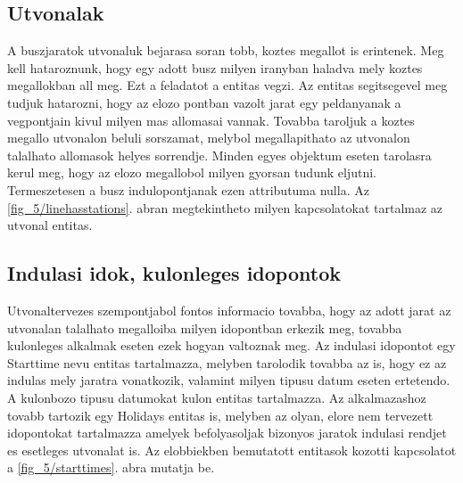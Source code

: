 \subsection*{Utvonalak}
\label{linehasstationsdetails}
A buszjaratok utvonaluk bejarasa soran tobb, koztes megallot is erintenek. 
Meg kell hataroznunk, hogy egy adott busz milyen iranyban haladva mely koztes megallokban all meg. 
Ezt a feladatot a  entitas vegzi. 
Az entitas segitsegevel meg tudjuk hatarozni, hogy az elozo pontban vazolt jarat egy peldanyanak a vegpontjain kivul milyen mas allomasai vannak. 
Tovabba taroljuk a koztes megallo utvonalon beluli sorszamat, melybol megallapithato az utvonalon talalhato allomasok helyes sorrendje. 
Minden egyes objektum eseten tarolasra kerul meg, hogy az elozo megallobol milyen gyorsan tudunk eljutni. 
Termeszetesen a busz indulopontjanak ezen attributuma nulla. 
Az \ref{fig_5/linehasstations}. abran megtekintheto milyen kapcsolatokat tartalmaz az utvonal entitas. 
\subsection*{Indulasi idok, kulonleges idopontok}
\label{starttimes}
Utvonaltervezes szempontjabol fontos informacio tovabba, hogy az adott jarat az utvonalan talalhato megalloiba milyen idopontban erkezik meg, tovabba kulonleges alkalmak eseten ezek hogyan valtoznak meg. 
Az indulasi idopontot egy Starttime nevu entitas tartalmazza, melyben tarolodik tovabba az is, hogy ez az indulas mely jaratra vonatkozik, valamint milyen tipusu datum eseten ertetendo. 
A kulonbozo tipusu datumokat kulon entitas tartalmazza. 
Az alkalmazashoz tovabb tartozik egy Holidays entitas is, melyben az olyan, elore nem tervezett idopontokat tartalmazza amelyek befolyasoljak bizonyos jaratok indulasi rendjet es esetleges utvonalat is. 
Az elobbiekben bemutatott entitasok kozotti kapcsolatot a \ref{fig_5/starttimes}. abra mutatja be. 

